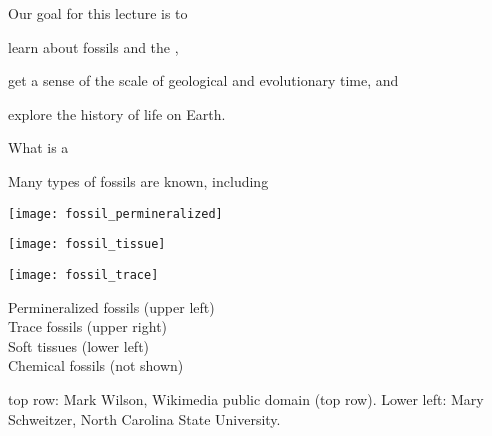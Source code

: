 \documentclass[t]{beamer}
\begin{document}
\begin{frame}{Our goal for this lecture is to}
	
	\hangpara learn about fossils and the ,
	
	\hangpara get a sense of the scale of geological and evolutionary time, and

	\hangpara explore the history of life on Earth.
	

\end{frame}
%


\begin{frame}{What is a  }



\end{frame}
%
\begin{frame}[t]{Many types of fossils are known, including}

	\vspace*{-\baselineskip}

	\begin{multicols}{2}

		\texttt{[image: fossil\_permineralized]}\vspace*{\baselineskip}

		\texttt{[image: fossil\_tissue]}

	\columnbreak

		\texttt{[image: fossil\_trace]}\vspace*{\baselineskip}

		Permineralized fossils (upper left)\\
		Trace fossils (upper right)\\
		Soft tissues (lower left)\\
		Chemical fossils (not shown)

	\end{multicols}

	\vfilll

	\tiny top row: Mark Wilson, Wikimedia public domain (top row). Lower left: \textcopyright Mary Schweitzer, North Carolina State University.

\end{frame}
\end{document}
